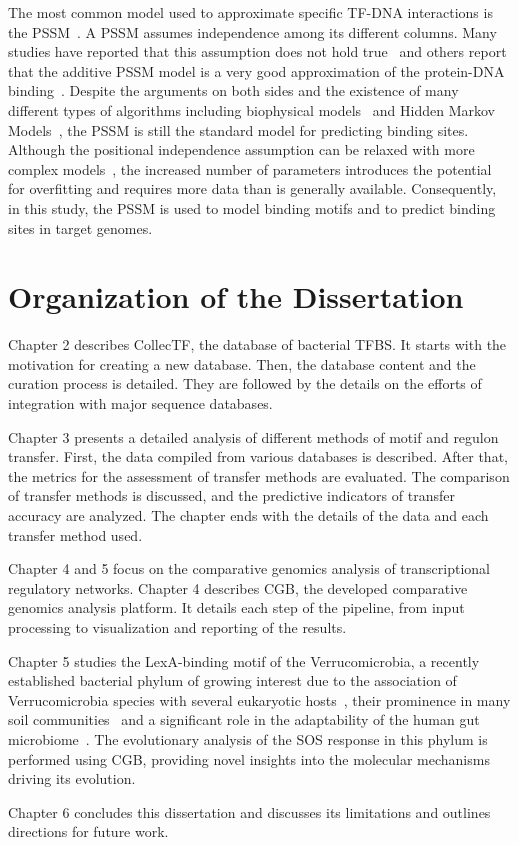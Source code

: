 The most common model used to approximate specific TF-DNA interactions is the
PSSM~\citep{stormo2000dna, sharon2008feature}. A PSSM assumes independence among
its different columns. Many studies have reported that this assumption does not
hold true~\citep{man2001non, bulyk2002nucleotides, tomovic2007position,
  osada2004comparative} and others report that the additive PSSM model is a
very good approximation of the protein-DNA
binding~\citep{benos2002additivity}. Despite the arguments on both sides and
the existence of many different types of algorithms including biophysical
models~\citep{stormo1998specificity, djordjevic2003biophysical} and Hidden
Markov Models~\citep{sinha2003probabilistic, drawid2009ohmm,
  salzberg1998microbial}, the PSSM is still the standard model for predicting
binding sites. Although the positional independence assumption can be relaxed
with more complex models~\citep{ben2005identification, zhao2012improved,
  siddharthan2010dinucleotide, barash2003modeling}, the increased number of
parameters introduces the potential for overfitting and requires more data than
is generally available. Consequently, in this study, the PSSM is used to model
binding motifs and to predict binding sites in target genomes.

\section{Organization of the Dissertation}

Chapter 2 describes CollecTF, the database of bacterial TFBS. It starts with
the motivation for creating a new database. Then, the database content and the
curation process is detailed. They are followed by the details on the efforts
of integration with major sequence databases.

Chapter 3 presents a detailed analysis of different methods of motif and
regulon transfer. First, the data compiled from various databases is
described. After that, the metrics for the assessment of transfer methods are
evaluated. The comparison of transfer methods is discussed, and the predictive
indicators of transfer accuracy are analyzed. The chapter ends with the details
of the data and each transfer method used.

Chapter 4 and 5 focus on the comparative genomics analysis of transcriptional
regulatory networks. Chapter 4 describes CGB, the developed comparative
genomics analysis platform. It details each step of the pipeline, from input
processing to visualization and reporting of the results.

Chapter 5 studies the LexA-binding motif of the Verrucomicrobia, a recently
established bacterial phylum of growing interest due to the association of
Verrucomicrobia species with several eukaryotic hosts~\citep{sait2011genomic},
their prominence in many soil communities~\citep{bergmann2011under} and a
significant role in the adaptability of the human gut
microbiome~\citep{dubourg2013high}. The evolutionary analysis of the SOS
response in this phylum is performed using CGB, providing novel insights into the
molecular mechanisms driving its evolution.

Chapter 6 concludes this dissertation and discusses its limitations and
outlines directions for future work.
